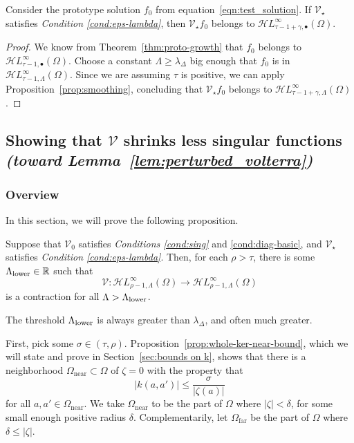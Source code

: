 \documentclass[final]{siamart220329}
\newcommand{\R}{\mathbb{R}}
\newcommand{\singexp}[2]{\mathcal{H}L^\infty_{#1, #2}}
\newcommand{\singexpalg}[1]{\singexp{#1}{\bullet}}
\newcommand{\volterra}{\mathcal{V}}
\newcommand{\hardpart}{\mathcal{V}_0}
\newcommand{\softpart}{\mathcal{V}_\star}
\newcommand{\solproto}{f_0}
\newcommand{\domain}{\Omega}
\newcommand{\near}{\Omega_\text{near}}
\newcommand{\far}{\Omega_\text{far}}
\begin{document}
\begin{corollary}\label{cor:pertub_f0}
Consider the prototype solution $\solproto$ from equation~\eqref{eqn:test_solution}. If $\softpart$ satisfies {\em Condition \eqref{cond:eps-lambda}}, then $\softpart \solproto$ belongs to $\singexpalg{\tau-1+\gamma}(\domain)$.
\end{corollary}
\begin{proof}
We know from Theorem~\ref{thm:proto-growth} that $\solproto$ belongs to $\singexpalg{\tau-1}(\domain)$. Choose a constant $\Lambda \ge \lambda_\Delta$ big enough that $\solproto$ is in $\singexp{\tau-1}{\Lambda}(\domain)$. Since we are assuming $\tau$ is positive, we can apply Proposition~\ref{prop:smoothing}, concluding that $\softpart \solproto$ belongs to $\singexp{\tau-1+\gamma}{\Lambda}(\domain)$.
\end{proof}
\subsection{Showing that $\volterra$ shrinks less singular functions \\ \textit{(toward Lemma~\ref{lem:perturbed_volterra})}}\label{sec:V is a contraction}
\subsubsection{Overview}
In this section, we will prove the following proposition. %

\begin{proposition}\label{prop:get-contraction}
Suppose that $\hardpart$ satisfies {\em Conditions \eqref{cond:sing}} and \eqref{cond:diag-basic}, and $\softpart$ satisfies {\em Condition \eqref{cond:eps-lambda}}. Then, for each $\rho > \tau$, there is some $\Lambda_\text{\rm lower} \in \R$ such that
\[\volterra\colon\singexp{\rho-1}{\Lambda}(\domain)\to\singexp{\rho-1}{\Lambda}(\domain)\]
is a contraction for all $\Lambda > \Lambda_\text{\rm lower}$.
\end{proposition}
\begin{rmk}
The threshold $\Lambda_\text{\rm lower}$ is always greater than $\lambda_\Delta$, and often much greater.
\end{rmk}
First, pick some $\sigma \in (\tau, \rho)$. Proposition~\ref{prop:whole-ker-near-bound}, which we will state and prove in Section~\ref{sec:bounds on k}, shows that there is a neighborhood $\near \subset \domain$ of $\zeta = 0$ with the property that
\begin{equation}\label{near-limit}
|k(a, a')| \le \frac{\sigma}{|\zeta(a)|}
\end{equation}
for all $a, a' \in \near$. We take $\near$ to be the part of $\domain$ where $|\zeta| < \delta$, for some small enough positive radius $\delta$. Complementarily, let $\far$ be the part of $\domain$ where $\delta \le |\zeta|$.
\end{document}

